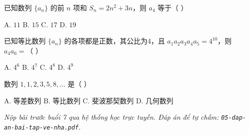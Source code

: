 \documentclass[11pt, a4paper]{article}
\begin{document}
\begin{baitap}[13]
已知数列 $\{a_n\}$ 的前 $n$ 项和 $S_n = 2n^2 + 3n$，则 $a_4$ 等于（ ）
\par\vspace{3pt}
\noindent A. $11$ \quad B. $15$ \quad C. $17$ \quad D. $19$
\end{baitap}

\begin{baitap}[14]
已知等比数列 $\{a_n\}$ 的各项都是正数，其公比为4，且 $a_1a_2a_3a_4a_5 = 4^{10}$，则 $a_4a_6 =$（ ）
\par\vspace{3pt}
\noindent A. $4^6$ \quad B. $4^7$ \quad C. $4^8$ \quad D. $4^9$
\end{baitap}

\begin{baitap}[15]
数列 $1, 1, 2, 3, 5, 8, \ldots$ 是（ ）
\par\vspace{3pt}
\noindent A. 等差数列 \quad B. 等比数列 \quad C. 斐波那契数列 \quad D. 几何数列
\end{baitap}

\vspace{0.3cm}
\noindent\emph{Nộp bài trước buổi 7 qua hệ thống học trực tuyến. Đáp án để tự chấm: \texttt{05-dap-an-bai-tap-ve-nha.pdf}.}
\end{document}
